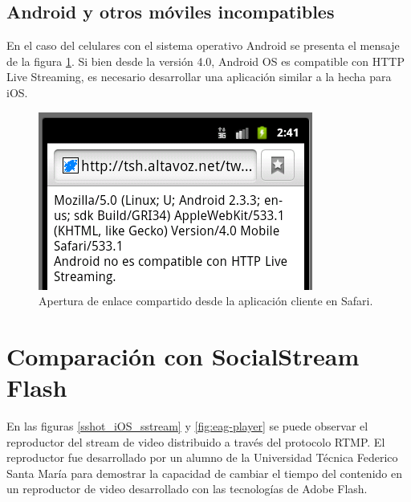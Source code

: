   \subsection{Android y otros móviles incompatibles}
  En el caso del celulares con el sistema operativo Android se presenta el mensaje de la figura \ref{fig:uagent-android}. Si bien desde la versión 4.0, Android OS es compatible con HTTP Live Streaming, es necesario desarrollar una aplicación similar a la hecha para iOS.
 \begin{figure}[H]
	\centering
	\includegraphics[scale=0.52]{imgs/uagent-android.png} 
	\caption{Apertura de enlace compartido desde la aplicación cliente en Safari.}
	\label{fig:uagent-android}
 \end{figure}  

\enlargethispage{2\baselineskip}
\section{Comparación con SocialStream Flash}
En las figuras \ref{sshot_iOS_sstream} y \ref{fig:eag-player} se puede observar el reproductor del stream de video distribuido a través del protocolo RTMP. El reproductor fue desarrollado por un alumno de la Universidad Técnica Federico Santa María para demostrar la capacidad de cambiar el tiempo del contenido en un reproductor de video desarrollado con las tecnologías de Adobe Flash.

